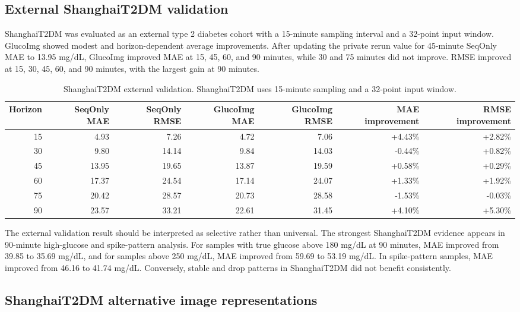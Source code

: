 \documentclass[11pt]{article}
\begin{document}
\subsection{External ShanghaiT2DM validation}

ShanghaiT2DM was evaluated as an external type 2 diabetes cohort with a 15-minute sampling interval and a 32-point input window. GlucoImg showed modest and horizon-dependent average improvements. After updating the private rerun value for 45-minute SeqOnly MAE to 13.95 mg/dL, GlucoImg improved MAE at 15, 45, 60, and 90 minutes, while 30 and 75 minutes did not improve. RMSE improved at 15, 30, 45, 60, and 90 minutes, with the largest gain at 90 minutes.

\begin{table}[t]
\centering
\caption{ShanghaiT2DM external validation. ShanghaiT2DM uses 15-minute sampling and a 32-point input window.}
\label{tab:shanghai}
\small
\setlength{\tabcolsep}{4pt}
\begin{tabular}{rrrrrrr}
\toprule
Horizon & SeqOnly MAE & SeqOnly RMSE & GlucoImg MAE & GlucoImg RMSE & MAE improvement & RMSE improvement \\
\midrule
15 & 4.93 & 7.26 & 4.72 & 7.06 & +4.43\% & +2.82\% \\
30 & 9.80 & 14.14 & 9.84 & 14.03 & -0.44\% & +0.82\% \\
45 & 13.95 & 19.65 & 13.87 & 19.59 & +0.58\% & +0.29\% \\
60 & 17.37 & 24.54 & 17.14 & 24.07 & +1.33\% & +1.92\% \\
75 & 20.42 & 28.57 & 20.73 & 28.58 & -1.53\% & -0.03\% \\
90 & 23.57 & 33.21 & 22.61 & 31.45 & +4.10\% & +5.30\% \\
\bottomrule
\end{tabular}
\end{table}

The external validation result should be interpreted as selective rather than universal. The strongest ShanghaiT2DM evidence appears in 90-minute high-glucose and spike-pattern analysis. For samples with true glucose above 180 mg/dL at 90 minutes, MAE improved from 39.85 to 35.69 mg/dL, and for samples above 250 mg/dL, MAE improved from 59.69 to 53.19 mg/dL. In spike-pattern samples, MAE improved from 46.16 to 41.74 mg/dL. Conversely, stable and drop patterns in ShanghaiT2DM did not benefit consistently.

\subsection{ShanghaiT2DM alternative image representations}
\end{document}
